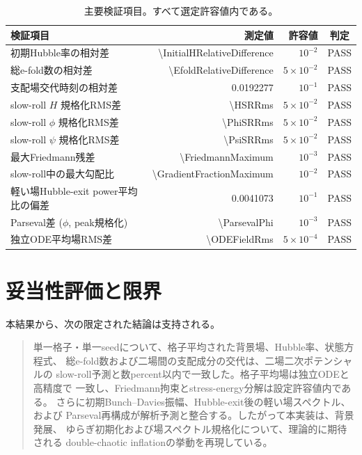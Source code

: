 \documentclass[a4paper,11pt]{ltjsarticle}
\newcommand{\pass}{\textcolor{green!45!black}{PASS}}
\begin{document}
\begin{table}[H]
\centering
\caption{主要検証項目。すべて選定許容値内である。}
\small
\begin{tabular}{p{}rrc}
\toprule
検証項目 & 測定値 & 許容値 & 判定 \\
\midrule
初期Hubble率の相対差 & \num{\InitialHRelativeDifference} & $10^{-2}$ & \pass \\
総e-fold数の相対差 & \num{\EfoldRelativeDifference} & $5\times10^{-2}$ & \pass \\
支配場交代時刻の相対差 & \num{0.0192277} & $10^{-1}$ & \pass \\
slow-roll $H$ 規格化RMS差 & \num{\HSRRms} & $5\times10^{-2}$ & \pass \\
slow-roll $\phi$ 規格化RMS差 & \num{\PhiSRRms} & $5\times10^{-2}$ & \pass \\
slow-roll $\psi$ 規格化RMS差 & \num{\PsiSRRms} & $5\times10^{-2}$ & \pass \\
最大Friedmann残差 & \num{\FriedmannMaximum} & $10^{-3}$ & \pass \\
slow-roll中の最大勾配比 & \num{\GradientFractionMaximum} & $10^{-2}$ & \pass \\
軽い場Hubble-exit power平均比の偏差 & \num{0.0041073} & $10^{-1}$ & \pass \\
Parseval差 ($\phi$, peak規格化) & \num{\ParsevalPhi} & $10^{-3}$ & \pass \\
独立ODE平均場RMS差 & \num{\ODEFieldRms} & $5\times10^{-4}$ & \pass \\
\bottomrule
\end{tabular}
\end{table}

\section{妥当性評価と限界}

本結果から、次の限定された結論は支持される。

\begin{quote}
単一格子・単一seedについて、格子平均された背景場、Hubble率、状態方程式、
総e-fold数および二場間の支配成分の交代は、二場二次ポテンシャルの
slow-roll予測と数percent以内で一致した。格子平均場は独立ODEと高精度で
一致し、Friedmann拘束とstress-energy分解は設定許容値内である。
さらに初期Bunch--Davies振幅、Hubble-exit後の軽い場スペクトル、および
Parseval再構成が解析予測と整合する。したがって本実装は、背景発展、
ゆらぎ初期化および場スペクトル規格化について、理論的に期待される
double-chaotic inflationの挙動を再現している。
\end{quote}
\end{document}
